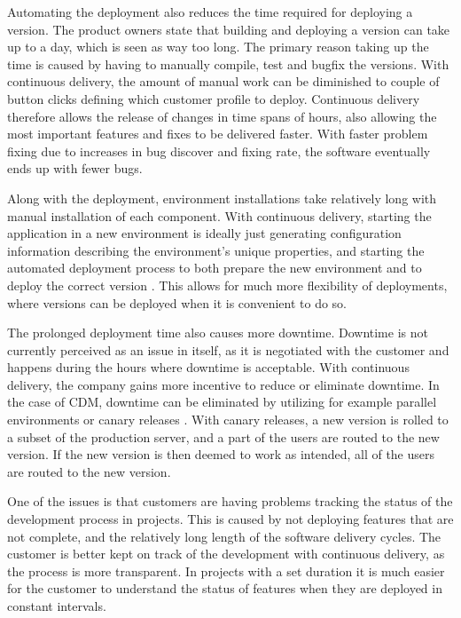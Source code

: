 \documentclass[english, grading]{tktltiki2}
\theoremstyle{definition}
\theoremstyle{remark}
\begin{document}
Automating the deployment also reduces the time required for deploying a version. The product owners state that building and deploying a version can take up to a day, which is seen as way too long. The primary reason taking up the time is caused by having to manually compile, test and bugfix the versions. With continuous delivery, the amount of manual work can be diminished to couple of button clicks defining which customer profile to deploy. Continuous delivery therefore allows the release of changes in time spans of hours, also allowing the most important features and fixes to be delivered faster. With faster problem fixing due to increases in bug discover and fixing rate, the software eventually ends up with fewer bugs. %

Along with the deployment, environment installations take relatively long with manual installation of each component. With continuous delivery, starting the application in a new environment is ideally just generating configuration information describing the environment's unique properties, and starting the automated deployment process to both prepare the new environment and to deploy the correct version \cite{cdbook}. This allows for much more flexibility of deployments, where versions can be deployed when it is convenient to do so.

The prolonged deployment time also causes more downtime. Downtime is not currently perceived as an issue in itself, as it is negotiated with the customer and happens during the hours where downtime is acceptable. With continuous delivery, the company gains more incentive to reduce or eliminate downtime. In the case of CDM, downtime can be eliminated by utilizing for example parallel environments or canary releases \cite{cdbook}. With canary releases, a new version is rolled to a subset of the production server, and a part of the users are routed to the new version. If the new version is then deemed to work as intended, all of the users are routed to the new version.

One of the issues is that customers are having problems tracking the status of the development process in projects. This is caused by not deploying features that are not complete, and the relatively long length of the software delivery cycles. The customer is better kept on track of the development with continuous delivery, as the process is more transparent. In projects with a set duration it is much easier for the customer to understand the status of features when they are deployed in constant intervals.
\end{document}
